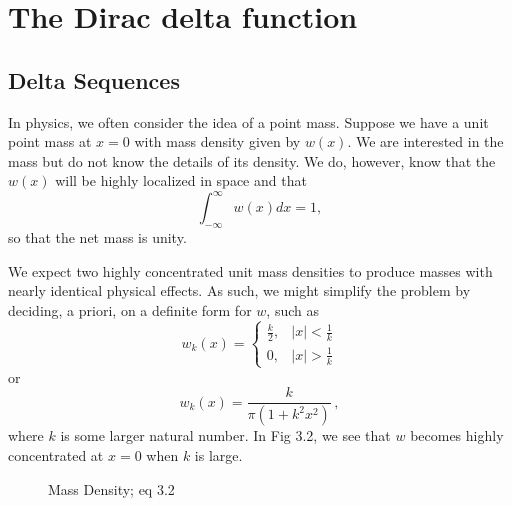 \section{The Dirac delta function}
\setcounter{example}{0}
\subsection{Delta Sequences}
In physics, we often consider the idea of a point mass. Suppose we have a unit point mass at \(x=0\) with mass density given by \(w(x)\). We are interested in the mass but do not know the details of its density. We do, however, know that the \(w(x)\) will be highly localized in space and that 
\begin{equation}
    \int_{-\infty}^{\infty} w(x) dx = 1,
\end{equation}
so that the net mass is unity.

We expect two highly concentrated unit mass densities to produce masses with nearly identical physical effects. As such, we might simplify the problem by deciding, a priori, on a definite form for \(w\), such as
\begin{equation}
    w_k(x) = \begin{cases}
        \frac{k}{2}, & |x|<\frac{1}{k}\\
        0, & |x|>\frac{1}{k}
    \end{cases}
\end{equation}
or
\begin{equation}
    w_k(x)=\frac{k}{\pi (1+k^2x^2)}\,,
\end{equation}
where \(k\) is some larger natural number. In Fig 3.2, we see that \(w\) becomes highly concentrated at \(x=0\) when \(k\) is large.

\begin{figure}
    \centering
    \caption{Mass Density; eq 3.2}
\end{figure}


